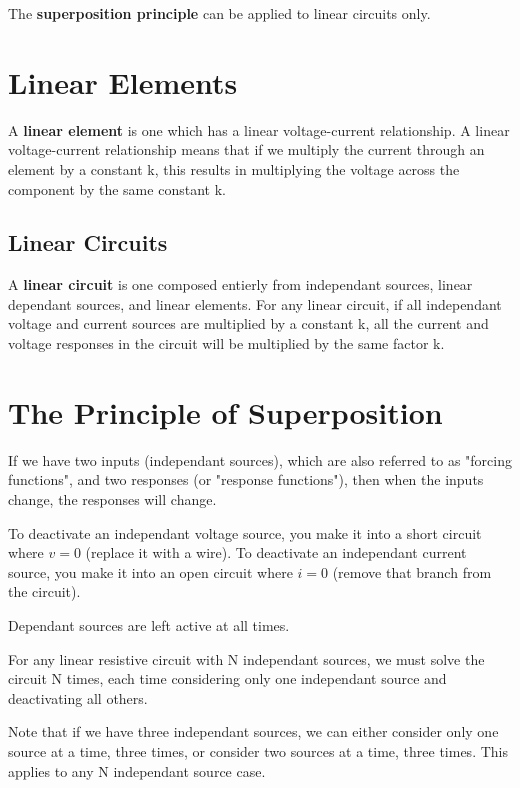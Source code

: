 \documentclass[12pt]{article}
\begin{document}
The {\bf superposition principle} can be applied to linear circuits only.

\section*{Linear Elements}
A {\bf linear element} is one which has a linear voltage-current relationship. A linear voltage-current relationship means that if we multiply the current through an element by a constant k, this results in multiplying the voltage across the component by the same constant k.

\subsection*{Linear Circuits}
A {\bf linear circuit} is one composed entierly from independant sources, linear dependant sources, and linear elements. For any linear circuit, if all independant voltage and current sources are multiplied by a constant k, all the current and voltage responses in the circuit will be multiplied by the same factor k.

\section*{The Principle of Superposition}
If we have two inputs (independant sources), which are also referred to as "forcing functions", and two responses (or "response functions"), then when the inputs change, the responses will change.


To deactivate an independant voltage source, you make it into a short circuit where $v = 0$ (replace it with a wire). To deactivate an independant current source, you make it into an open circuit where $i = 0$ (remove that branch from the circuit).

Dependant sources are left active at all times.

For any linear resistive circuit with N independant sources, we must solve the circuit N times, each time considering only one independant source and deactivating all others.

Note that if we have three independant sources, we can either consider only one source at a time, three times, or consider two sources at a time, three times. This applies to any N independant source case.
\end{document}
